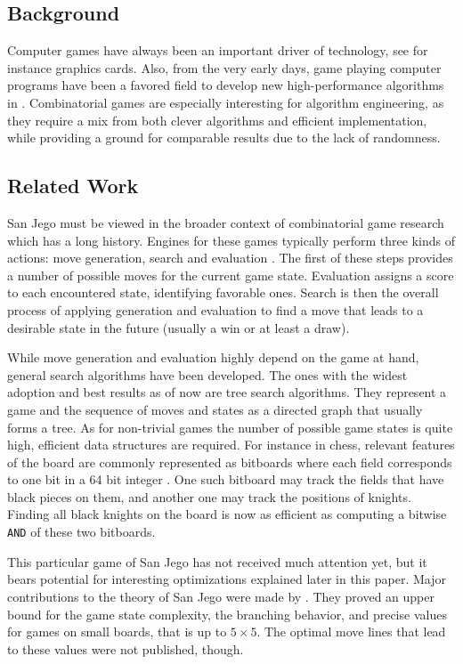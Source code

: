 \documentclass[sigconf]{acmart}
\begin{document}
\subsection{Background}
Computer games have always been an important driver of technology, see for instance graphics cards.
Also, from the very early days, game playing computer programs have been a favored field to develop new high-performance algorithms in \cite{Shannon1950}.
Combinatorial games are especially interesting for algorithm engineering, as they require a mix from both clever algorithms and efficient implementation, while providing a ground for comparable results due to the lack of randomness.

\subsection{Related Work}
San Jego must be viewed in the broader context of combinatorial game research which has a long history.
Engines for these games typically perform three kinds of actions: move generation, search and evaluation \cite{Bimonugroho2020}.
The first of these steps provides a number of possible moves for the current game state.
Evaluation assigns a score to each encountered state, identifying favorable ones.
Search is then the overall process of applying generation and evaluation to find a move that leads to a desirable state in the future (usually a win or at least a draw).

While move generation and evaluation highly depend on the game at hand, general search algorithms have been developed.
The ones with the widest adoption and best results as of now are tree search algorithms.
They represent a game and the sequence of moves and states as a directed graph that usually forms a tree.
As for non-trivial games the number of possible game states is quite high, efficient data structures are required.
For instance in chess, relevant features of the board are commonly represented as bitboards where each field corresponds to one bit in a 64 bit integer \cite{Bimonugroho2020}.
One such bitboard may track the fields that have black pieces on them, and another one may track the positions of knights.
Finding all black knights on the board is now as efficient as computing a bitwise \texttt{AND} of these two bitboards.

This particular game of San Jego has not received much attention yet, but it bears potential for interesting optimizations explained later in this paper.
Major contributions to the theory of San Jego were made by \citeauthor{Althöfer2020} \cite{Althöfer2020}.
They proved an upper bound for the game state complexity, the branching behavior, and precise values for games on small boards, that is up to $5\times5$.
The optimal move lines that lead to these values were not published, though.
\end{document}
